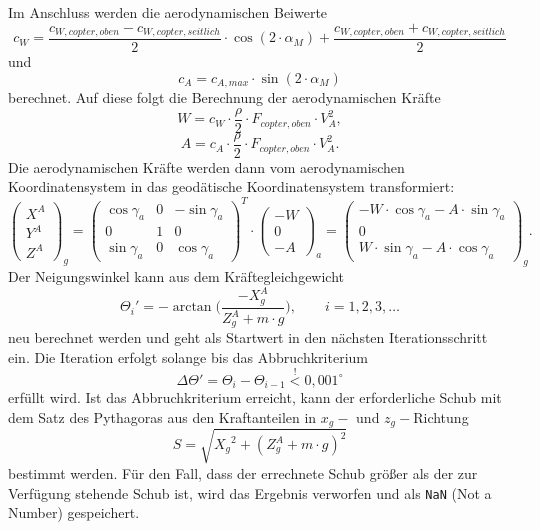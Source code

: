 Im Anschluss werden die aerodynamischen Beiwerte 
\begin{equation}
	c_W = \frac{c_{W,copter,oben}-c_{W,copter,seitlich}}{2}\cdot \cos(2\cdot \alpha_M)+\frac{c_{W,copter,oben}+c_{W,copter,seitlich}}{2}
\end{equation} und 
\begin{equation}
	c_A = c_{A,max}\cdot \sin(2\cdot \alpha_M)
\end{equation}
berechnet. Auf diese folgt die Berechnung der aerodynamischen Kräfte
\begin{equation}
	W = c_W\cdot \frac{\rho}{2}\cdot F_{copter,oben}\cdot V_A^2, \label{eq:widerstand}
\end{equation}
\begin{equation}
	A = c_A\cdot \frac{\rho}{2}\cdot F_{copter,oben}\cdot V_A^2.
	\label{eq:auftrieb}
\end{equation}
Die aerodynamischen Kräfte werden dann vom aerodynamischen Koordinatensystem in das geodätische Koordinatensystem transformiert:
\begin{equation}
	\begin{pmatrix} X^A \\ Y^A \\Z^A \end{pmatrix}_g = \begin{pmatrix} \cos\gamma_a & 0 & -\sin\gamma_a \\ 0 & 1 & 0 \\ \sin\gamma_a & 0 & \cos\gamma_a \end{pmatrix}^T\cdot \begin{pmatrix} -W \\ 0 \\ -A \end{pmatrix}_a = \begin{pmatrix} -W\cdot\cos\gamma_a-A\cdot\sin\gamma_a \\ 0 \\ W\cdot\sin\gamma_a-A\cdot\cos\gamma_a \end{pmatrix}_g.
\end{equation}
Der Neigungswinkel kann aus dem Kräftegleichgewicht
\begin{equation}
	\Theta_i' = -\arctan\Big(\frac{-X_g^A}{Z_g^A + m\cdot g}\Big), \qquad i =1,2,3,\dots
	\label{eq:neigungswinkel}
\end{equation}
neu berechnet werden und geht als Startwert in den nächsten Iterationsschritt ein. Die Iteration erfolgt solange bis das Abbruchkriterium
\begin{equation}
	\Delta\Theta' = \Theta_i-\Theta_{i-1}\stackrel{!}{<}0,001^{\circ}
\end{equation}
erfüllt wird. 
Ist das Abbruchkriterium erreicht, kann der erforderliche Schub mit dem Satz des Pythagoras aus den Kraftanteilen in \(x_g-\) und \(z_g-\)Richtung
\begin{equation}
	S = \sqrt{{X_g}^2+(Z_g^A+m\cdot g)^2}
	\label{eq:schub_multicopter}
\end{equation}
bestimmt werden.
Für den Fall, dass der errechnete Schub größer als der zur Verfügung stehende Schub ist, wird das Ergebnis verworfen und als \texttt{NaN} (Not a Number) gespeichert.



